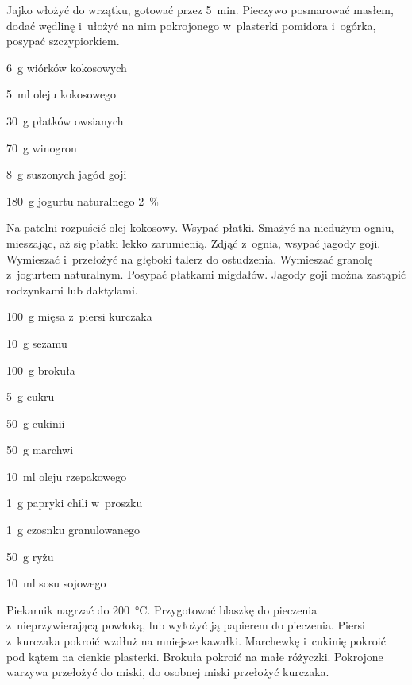 \documentclass[../main.tex]{subfiles}
\begin{document}
Jajko włożyć do wrzątku, gotować przez \qty{5}{\minute}. Pieczywo posmarować
masłem, dodać wędlinę i~ułożyć na nim pokrojonego w~plasterki pomidora
i~ogórka, posypać szczypiorkiem.


\begin{Ingred}
    \item \qty{6}{\gram} wiórków kokosowych
    \item \qty{5}{\milli\litre} oleju kokosowego
    \item \qty{30}{\gram} płatków owsianych
    \item \qty{70}{\gram} winogron
    \item \qty{8}{\gram} suszonych jagód goji
    \item \qty{180}{\gram} jogurtu naturalnego \qty{2}{\percent}
\end{Ingred}

Na patelni rozpuścić olej kokosowy. Wsypać płatki. Smażyć na niedużym ogniu,
mieszając, aż się płatki lekko zarumienią. Zdjąć z~ognia, wsypać jagody goji.
Wymieszać i~przełożyć na głęboki talerz do ostudzenia. Wymieszać granolę
z~jogurtem naturalnym. Posypać płatkami migdałów. Jagody goji można zastąpić
rodzynkami lub daktylami.


\begin{Ingred}
    \item \qty{100}{\gram} mięsa z~piersi kurczaka
    \item \qty{10}{\gram} sezamu
    \item \qty{100}{\gram} brokuła
    \item \qty{5}{\gram} cukru
    \item \qty{50}{\gram} cukinii
    \item \qty{50}{\gram} marchwi
    \item \qty{10}{\milli\litre} oleju rzepakowego
    \item \qty{1}{\gram} papryki chili w~proszku
    \item \qty{1}{\gram} czosnku granulowanego
    \item \qty{50}{\gram} ryżu
    \item \qty{10}{\milli\litre} sosu sojowego
\end{Ingred}

Piekarnik nagrzać do \qty{200}{\celsius}. Przygotować blaszkę do pieczenia
z~nieprzywierającą powłoką, lub wyłożyć ją papierem do pieczenia. Piersi
z~kurczaka pokroić wzdłuż na mniejsze kawałki. Marchewkę i~cukinię pokroić pod
kątem na cienkie plasterki. Brokuła pokroić na małe różyczki. Pokrojone warzywa
przełożyć do miski, do osobnej miski przełożyć kurczaka.
\end{document}
